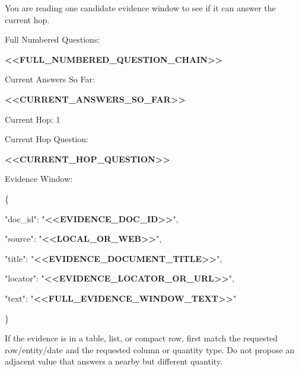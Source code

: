 \begin{tcolorbox}[colback=white, colframe=my-green, coltitle=black, parskip=5mm, title=\textbf{Document Read}, halign=flush left, enhanced, breakable, skin first=enhanced, skin middle=enhanced, skin last=enhanced]
\begin{scriptsize}
\ttfamily
\setlength{\parindent}{0pt}
You are reading one candidate evidence window to see if it can answer the current hop.\par
\mbox{}\par
Full Numbered Questions:\par
\textcolor{my-green}{\textbf{\textless{}\textless{}FULL\_NUMBERED\_QUESTION\_CHAIN\textgreater{}\textgreater{}}}\par
\mbox{}\par
Current Answers So Far:\par
\textcolor{my-green}{\textbf{\textless{}\textless{}CURRENT\_ANSWERS\_SO\_FAR\textgreater{}\textgreater{}}}\par
\mbox{}\par
Current Hop: 1\par
Current Hop Question:\par
\textcolor{my-green}{\textbf{\textless{}\textless{}CURRENT\_HOP\_QUESTION\textgreater{}\textgreater{}}}\par
\mbox{}\par
Evidence Window:\par
\{\par
  "doc\_id": "\textcolor{my-green}{\textbf{\textless{}\textless{}EVIDENCE\_DOC\_ID\textgreater{}\textgreater{}}}",\par
  "source": "\textcolor{my-green}{\textbf{\textless{}\textless{}LOCAL\_OR\_WEB\textgreater{}\textgreater{}}}",\par
  "title": "\textcolor{my-green}{\textbf{\textless{}\textless{}EVIDENCE\_DOCUMENT\_TITLE\textgreater{}\textgreater{}}}",\par
  "locator": "\textcolor{my-green}{\textbf{\textless{}\textless{}EVIDENCE\_LOCATOR\_OR\_URL\textgreater{}\textgreater{}}}",\par
  "text": "\textcolor{my-green}{\textbf{\textless{}\textless{}FULL\_EVIDENCE\_WINDOW\_TEXT\textgreater{}\textgreater{}}}"\par
\}\par
\mbox{}\par
If the evidence is in a table, list, or compact row, first match the requested row/entity/date and the requested column or quantity type. Do not propose an adjacent value that answers a nearby but different quantity.\par

\end{scriptsize}
\end{tcolorbox}
